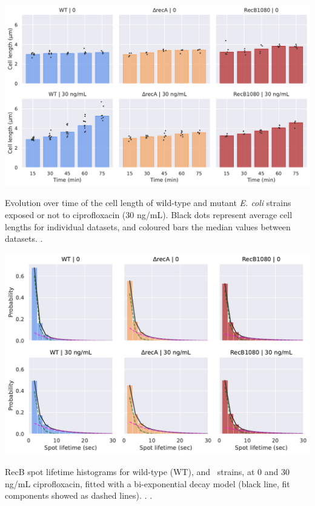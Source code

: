 \begin{suppfigure*}[htbp]
    \begin{center}
    \includegraphics[width=.8\textwidth]{SI_Figures/Mutants_cell_lengths.pdf}
    \end{center}
    \caption{Evolution over time of the cell length of wild-type and mutant \emph{E. coli} strains exposed or not to ciprofloxacin (30 ng/mL). Black dots represent average cell lengths for individual datasets, and coloured bars the median values between datasets. .}
    \label{SIFig:mutants_cell_lengths}
\end{suppfigure*}

\begin{suppfigure*}[htbp]
    \begin{center}
    \includegraphics[width=.8\textwidth]{SI_Figures/Mutants_RecB_fits.pdf}
    \end{center}
    \caption{RecB spot lifetime histograms for wild-type (WT), \dreca and \teneighty\ strains, at 0 and 30 ng/mL ciprofloxacin, fitted with a bi-exponential decay model (black line, fit components showed as dashed lines). . .}
    \label{SIFig:mutants_biexp_fits}
\end{suppfigure*}

